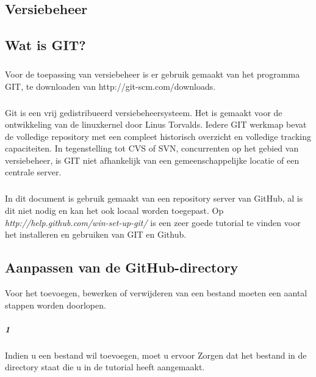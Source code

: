 \documentclass[12pt,a4paper]{report}
\begin{document}
\begin{flushleft}
\chapter{Versiebeheer}
\section{Wat is GIT?}
\paragraph*{}
Voor de toepassing van versiebeheer is er gebruik gemaakt van het programma GIT, te downloaden van http://git-scm.com/downloads.
\paragraph*{}
Git is een vrij gedistribueerd versiebeheersysteem. Het is gemaakt voor de ontwikkeling van de linuxkernel door Linus Torvalds. Iedere GIT werkmap bevat de volledige repository met een compleet historisch overzicht en volledige tracking capaciteiten. In tegenstelling tot CVS of SVN, concurrenten op het gebied van versiebeheer, is GIT niet afhankelijk van een gemeenschappelijke locatie of een centrale server.
\paragraph*{}
In dit document is gebruik gemaakt van een repository server van GitHub, al is dit niet nodig en kan het ook locaal worden toegepast.
Op \textit{http://help.github.com/win-set-up-git/} is een zeer goede tutorial te vinden voor het installeren en gebruiken van GIT en Github.
\section{Aanpassen van de GitHub-directory}
Voor het toevoegen, bewerken of verwijderen van een bestand moeten een aantal stappen worden doorlopen.
\paragraph*{1}
Indien u een bestand wil toevoegen, moet u ervoor Zorgen dat het bestand in de directory staat die u in de tutorial heeft aangemaakt.

\end{flushleft}
\end{document}

